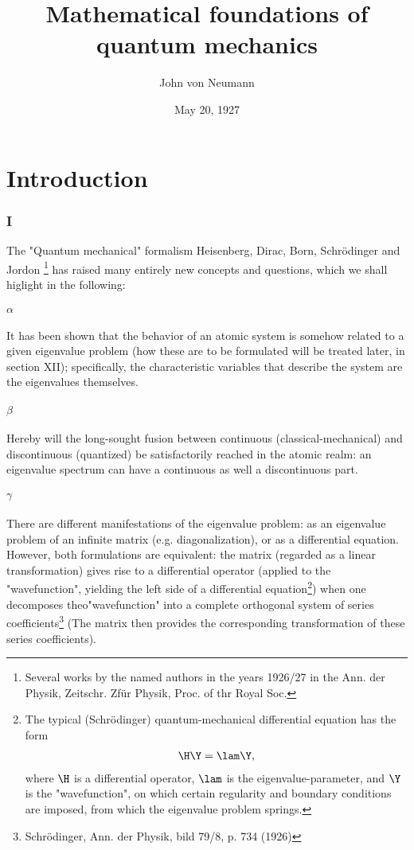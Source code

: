 \documentclass{article}
\title{Mathematical foundations of quantum mechanics}
\author{John von Neumann}
\date{May 20, 1927}
\newcommand{\uequ}[1]{
\begin{align*}
#1
\end{align*}
}
\begin{document}
\maketitle

\part*{Introduction}
\section*{I}
The "Quantum mechanical" formalism Heisenberg, Dirac, Born, Schrödinger and Jordon \footnote{Several works by the named authors in the years 1926/27 in the Ann. der Physik, Zeitschr. Zfür Physik, Proc. of thr Royal Soc.} has raised many entirely new concepts and questions, which we shall higlight in the following:

\subsection*{$\alpha$}
It has been shown that the behavior of an atomic system is somehow related to a given eigenvalue problem (how these are to be formulated will be treated later, in section XII); specifically, the characteristic variables that describe the system are the eigenvalues themselves.

\subsection*{$\beta$}
Hereby will the long-sought fusion between continuous (classical-mechanical) and discontinuous (quantized) be satisfactorily reached in the atomic realm: an eigenvalue spectrum can have a continuous as well a discontinuous part.

\subsection*{$\gamma$}
There are different manifestations of the eigenvalue problem: as an eigenvalue problem of an infinite matrix (e.g. diagonalization), or as a differential equation. However, both formulations are equivalent: the matrix (regarded as a linear transformation) gives rise to a differential operator (applied to the "wavefunction", yielding the left side of a differential equation\footnote{The typical (Schrödinger) quantum-mechanical differential equation has the form \uequ{\H\Y=\lam\Y,} where $\H$ is a differential operator, $\lam$ is the eigenvalue-parameter, and $\Y$ is the "wavefunction", on which certain regularity and boundary conditions are imposed, from which the eigenvalue problem springs.}) when one decomposes theo"wavefunction" into a complete orthogonal system of series coefficients\footnote{Schrödinger, Ann. der Physik, bild 79/8, p. 734 (1926)} (The matrix then provides the corresponding transformation of these series coefficients).
\end{document}
